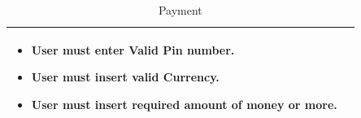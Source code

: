 \documentclass[11pt,oneside]{book}
\begin{document}
\begin{table}[h]
\begin{tabular}{|p{2.4cm}|p{11cm}|}
{\begin{itemize}
\item		User must enter Valid Pin number.
\item	User must insert valid Currency.
\item	User must insert required amount of money or more.



\end{itemize}
}\\
\hline
\end{tabular}
\caption{Payment}
\end{table}
\end{document}
